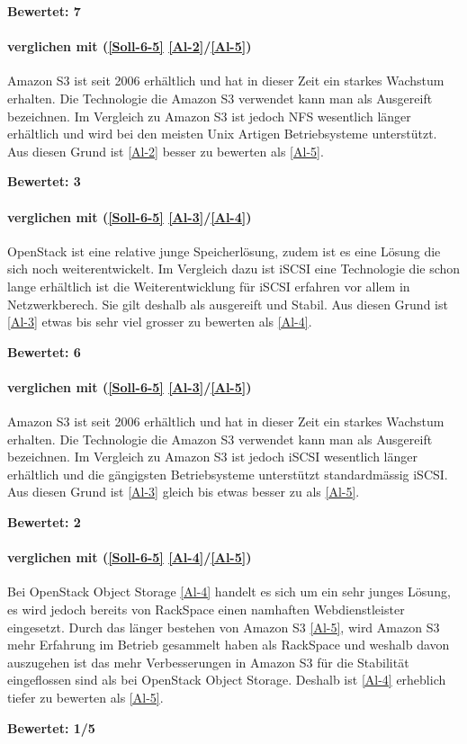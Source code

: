  \textbf{Bewertet: 7}

\paragraph*{  verglichen mit  (\ref{Soll-6-5} \ref{Al-2}/\ref{Al-5})}
Amazon S3 ist seit 2006 erhältlich und hat in dieser Zeit ein starkes Wachstum erhalten. Die Technologie die Amazon S3 verwendet kann man als Ausgereift bezeichnen. Im Vergleich zu Amazon S3 ist jedoch NFS wesentlich länger erhältlich und wird bei den meisten Unix Artigen Betriebsysteme unterstützt.
Aus diesen Grund ist  \ref{Al-2} besser zu bewerten als \ref{Al-5}.

 \textbf{Bewertet: 3}

\paragraph*{  verglichen mit  (\ref{Soll-6-5} \ref{Al-3}/\ref{Al-4})}
OpenStack ist eine relative junge Speicherlösung, zudem ist es eine Lösung die sich noch weiterentwickelt. Im Vergleich dazu ist iSCSI eine Technologie die schon lange erhältlich ist die Weiterentwicklung für iSCSI erfahren vor allem in Netzwerkberech. Sie gilt deshalb als ausgereift und Stabil.
Aus diesen Grund ist  \ref{Al-3} etwas bis sehr viel grosser zu bewerten als  \ref{Al-4}.

 \textbf{Bewertet: 6}

\paragraph*{  verglichen mit  (\ref{Soll-6-5} \ref{Al-3}/\ref{Al-5})}
Amazon S3 ist seit 2006 erhältlich und hat in dieser Zeit ein starkes Wachstum erhalten. Die Technologie die Amazon S3 verwendet kann man als Ausgereift bezeichnen. Im Vergleich zu Amazon S3 ist jedoch iSCSI wesentlich länger erhältlich und die gängigsten Betriebsysteme unterstützt standardmässig iSCSI. 
Aus diesen Grund ist  \ref{Al-3} gleich bis etwas besser zu als \ref{Al-5}.

 \textbf{Bewertet: 2}

\paragraph*{  verglichen mit  (\ref{Soll-6-5} \ref{Al-4}/\ref{Al-5})}
Bei OpenStack Object Storage \ref{Al-4} handelt es sich um ein sehr junges Lösung, es wird jedoch bereits von RackSpace einen namhaften Webdienstleister eingesetzt. Durch das länger bestehen von Amazon S3 \ref{Al-5}, wird Amazon S3 mehr Erfahrung im Betrieb gesammelt haben als RackSpace und weshalb davon auszugehen ist das mehr Verbesserungen in Amazon S3 für die Stabilität eingeflossen sind als bei OpenStack Object Storage. Deshalb ist \ref{Al-4} erheblich tiefer zu bewerten als \ref{Al-5}.

\textbf{Bewertet: 1/5}





